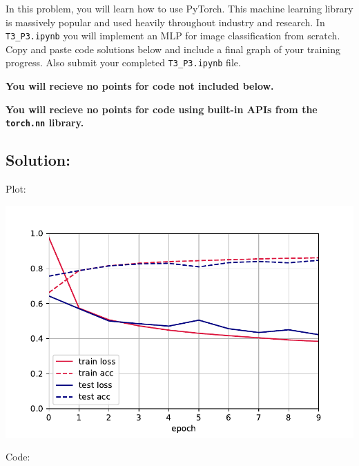 \documentclass[submit]{harvardml}
\begin{document}
\newpage

\begin{problem}
  In this problem, you will learn how to use PyTorch. This machine learning library is massively popular and used heavily throughout industry and research. In \verb|T3_P3.ipynb| you will implement an MLP for image classification from scratch. Copy and paste code solutions below and include a final graph of your training progress. Also submit your completed \verb|T3_P3.ipynb| file.

  {\bfseries You will recieve no points for code not included below.}

  {\bfseries You will recieve no points for code using built-in APIs from the \verb|torch.nn| library.}
  
\end{problem}


\subsection*{Solution:}
Plot:

\includegraphics[width=\linewidth]{final_plot}

Code:
\end{document}

